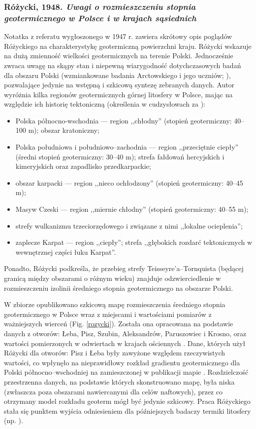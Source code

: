 \documentclass[11.5pt,twoside]{report}
\newcommand{\ct}[1]{\ignorespaces} %
\begin{document}
\subsubsection{Różycki, 1948. \textit{Uwagi o rozmieszczeniu stopnia geotermicznego w Polsce i w krajach sąsiednich}} \nocite{Rozycki.1948}
Notatka z referatu wygłoszonego w 1947 r. zawiera skrótowy opis poglądów Różyckiego na charakterystykę geotermiczną powierzchni kraju. Różycki wskazuje na dużą zmienność wielkości geotermicznych na terenie Polski. Jednocześnie zwraca uwagę na skąpy stan i niepewną wiarygodność dotychczasowych badań dla obszaru Polski (wzmiankowane badania Arctowskiego i jego uczniów; \ct{cite{bibid}}), pozwalające jedynie na wstępną i szkicową syntezę zebranych danych. Autor wyróżnia kilka regionów geotermicznych górnej litosfery w Polsce, mając na względzie ich historię tektoniczną (określenia w cudzysłowach za \cite{Rozycki.1948}):
 \begin{itemize}%
 	\item Polska północno-wschodnia --- region ,,chłodny'' (stopień geotermiczny: 40--100 m); obszar kratoniczny;
 	\item Polska południowa i południowo--zachodnia --- region ,,przeciętnie ciepły'' (średni stopień geotermiczny: 30--40 m); strefa fałdowań hercyjskich i kimeryjskich oraz zapadlisko przedkarpackie;
 	\item obszar karpacki --- region ,,nieco ochłodzony'' (stopień geotermiczny: 40--45 m);
 	\item Masyw Czeski --- region ,,miernie chłodny'' (stopień geotermiczny: 40--55 m);
 	\item strefy wulkanizmu trzeciorzędowego i związane z nimi ,,lokalne ocieplenia'';
 	\item zaplecze Karpat --- region ,,ciepły''; strefa ,,głębokich rozdarć tektonicznych w wewnętrznej części łuku Karpat''.
 \end{itemize}
Ponadto, Różycki podkreśla, że przebieg strefy Teisseyre'a--Tornquista (będącej granicą między obszarami o różnym wieku) znajduje odzwierciedlenie w rozmieszczeniu izolinii średniego stopnia geotermicznego na obszarze Polski.
 
W zbiorze opublikowano szkicową mapę rozmieszczenia średniego stopnia geotermicznego w Polsce wraz z miejscami i wartościami pomiarów z ważniejszych wierceń (Fig. \ref{rozycki}). Została ona opracowana na podstawie danych z otworów: Łeba, Pisz, Szubin, Aleksandrów, Paruszowiec i Krosno, oraz wartości pomierzonych w odwiertach w krajach ościennych \parencite{Plewa.1966}. Dane, których użył Różycki dla otworów: Pisz i Łeba były zawyżone względem rzeczywistych wartości, co wpłynęło na nieprawidłowy rozkład gradientu geotermicznego dla Polski północno--wschodniej na zamieszczonej w publikacji mapie \parencite{Stenz.1954}. Rozdzielczość przestrzenna danych, na podstawie których skonstruowano mapę, była niska (zwłaszcza poza obszarami nawiercanymi dla celów naftowych), przez co otrzymany model rozkładu geoterm mógł być jedynie szkicowy. Praca Różyckiego stała się punktem wyjścia odniesieniem dla pó\'{z}niejszych badaczy termiki litosfery (np. \cite{Plewa.1966,Majorowicz.1971}).
\end{document}
